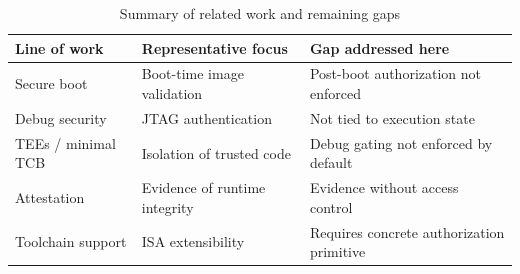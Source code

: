 \begin{table}[t]
  \centering
  \caption{Summary of related work and remaining gaps}
  \label{tab:lit-summary}
  \begin{tabular}{@{}p{2.7cm}p{3.8cm}p{3.8cm}@{}}
    \toprule
    \textbf{Line of work} & \textbf{Representative focus} & \textbf{Gap addressed here} \\
    \midrule
    Secure boot & Boot-time image validation & Post-boot authorization not enforced \\
    Debug security & JTAG authentication & Not tied to execution state \\
    TEEs / minimal TCB & Isolation of trusted code & Debug gating not enforced by default \\
    Attestation & Evidence of runtime integrity & Evidence without access control \\
    Toolchain support & ISA extensibility & Requires concrete authorization primitive \\
    \bottomrule
  \end{tabular}
\end{table}
